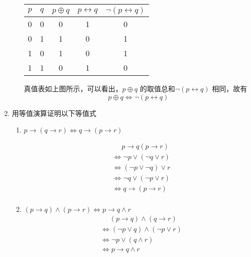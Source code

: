 \documentclass[UTF8]{ctexart}
\begin{document}
\begin{enumerate}
\begin{enumerate}
            \begin{table}[H]
                \centering
                \begin{tabular}{|ccccc|}
                    \hline
                    $p$ & $q$ & $p\oplus q$ & $p \leftrightarrow q$ & $\neg (p\leftrightarrow q)$ \\
                    \hline
                    0 & 0 & 0 &1 & 0 \\ 
                    \hline
                    0 & 1 & 1 &0 & 1 \\
                    \hline
                    1 & 0 & 1 &0 & 1 \\
                    \hline
                    1 & 1 & 0 &1 & 0 \\
                    \hline
                \end{tabular}
            \end{table}
            真值表如上图所示，可以看出，$p\oplus q$
            的取值总和$\neg (p \leftrightarrow q)$
            相同，故有
            \[
                p\oplus q \Leftrightarrow \neg(p\leftrightarrow q)
            \]
        \end{enumerate}



    \item 用等值演算证明以下等值式
        \begin{enumerate}
            \item $p \rightarrow (q \rightarrow r) \Leftrightarrow q \rightarrow ( p \rightarrow r)$
            
            \[  
                \begin{aligned}
                &\mathrel{\phantom{=}}p\rightarrow q(p\rightarrow r)\\
                 &\Leftrightarrow \neg p \vee (\neg q \vee r)\\
                 &\Leftrightarrow (\neg p \vee \neg q)\vee r\\
                 &\Leftrightarrow \neg q \vee (\neg p \vee r)\\
                 &\Leftrightarrow q \rightarrow (p \rightarrow r)\\
                \end{aligned}
             \]

            \item $( p \rightarrow q) \wedge ( p \rightarrow r) \Leftrightarrow p \rightarrow q \wedge r$
            \[
                \begin{aligned}
                    &\mathrel{\phantom{=}}(p\rightarrow q)\wedge (q\rightarrow r)\\
                    &\Leftrightarrow (\neg p \vee q)\wedge (\neg p \vee r)\\
                    &\Leftrightarrow \neg p \vee (q \wedge r)\\
                    &\Leftrightarrow p\rightarrow q \wedge r
                \end{aligned}
            \]
            

\end{enumerate}
\end{enumerate}
\end{document}

